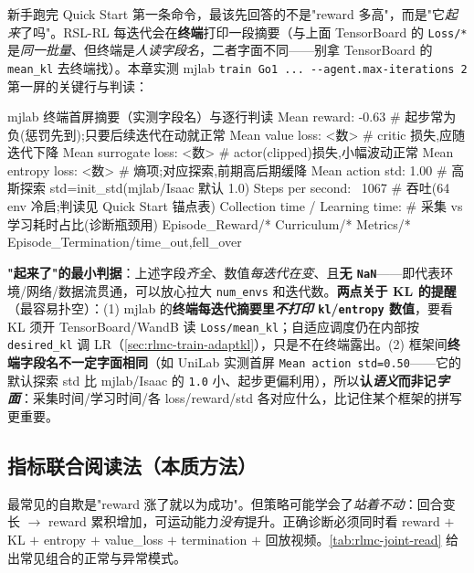 \begin{note}
新手跑完 Quick Start 第一条命令，最该先回答的不是"reward 多高"，而是"它\emph{起来}了吗"。RSL-RL 每迭代会在\textbf{终端}打印一段摘要（与上面 TensorBoard 的 \verb|Loss/*| 是\emph{同一批量}、但终端是\emph{人读字段名}，二者字面不同——别拿 TensorBoard 的 \verb|mean_kl| 去终端找）。本章实测 mjlab \verb|train Go1 ... --agent.max-iterations 2| 第一屏的关键行与判读：
\begin{codebox}[text]{mjlab 终端首屏摘要（实测字段名）与逐行判读}
Mean reward:          -0.63      # 起步常为负(惩罚先到);只要后续迭代在动就正常
Mean value loss:      <数>        # critic 损失,应随迭代下降
Mean surrogate loss:  <数>        # actor(clipped)损失,小幅波动正常
Mean entropy loss:    <数>        # 熵项;对应探索,前期高后期缓降
Mean action std:      1.00        # 高斯探索 std=init_std(mjlab/Isaac 默认 1.0)
Steps per second:     ~1067       # 吞吐(64 env 冷启;判读见 Quick Start 锚点表)
Collection time / Learning time:  # 采集 vs 学习耗时占比(诊断瓶颈用)
Episode_Reward/* Curriculum/* Metrics/* Episode_Termination/{time_out,fell_over}
\end{codebox}
\textbf{"起来了"的最小判据}：上述字段\emph{齐全}、数值\emph{每迭代在变}、且\textbf{无 \texttt{NaN}}——即代表环境/网络/数据流贯通，可以放心拉大 \verb|num_envs| 和迭代数。\textbf{两点关于 KL 的提醒}（最容易扑空）：(1) mjlab 的\textbf{终端每迭代摘要里\emph{不打印} \texttt{kl}/\texttt{entropy} 数值}，要看 KL 须开 TensorBoard/WandB 读 \verb|Loss/mean_kl|；自适应调度仍在内部按 \verb|desired_kl| 调 LR（\cref{sec:rlmc-train-adaptkl}），只是不在终端露出。(2) 框架间\textbf{终端字段名不一定字面相同}（如 UniLab 实测首屏 \verb|Mean action std=0.50|——它的默认探索 std 比 mjlab/Isaac 的 \verb|1.0| 小、起步更偏利用），所以\textbf{认\emph{语义}而非记\emph{字面}}：采集时间/学习时间/各 loss/reward/std 各对应什么，比记住某个框架的拼写更重要。
\end{note}

\subsection{指标联合阅读法（本质方法）}

\begin{insight}\label{ins:rlmc-joint-read}
最常见的自欺是"reward 涨了就以为成功"。但策略可能学会了\emph{站着不动}：回合变长 $\to$ reward 累积增加，可运动能力\emph{没有}提升。正确诊断必须同时看 reward $+$ KL $+$ entropy $+$ value\_loss $+$ termination $+$ 回放视频。\cref{tab:rlmc-joint-read} 给出常见组合的正常与异常模式。
\end{insight}

